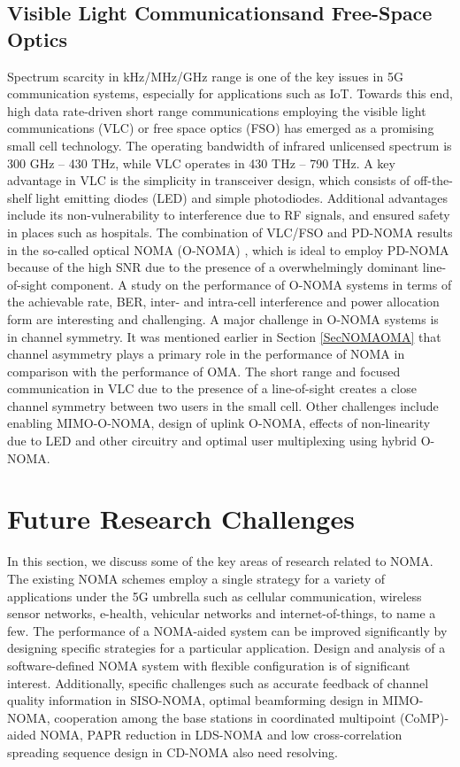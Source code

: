 \begin{multicols}{2}
\subsection{Visible Light Communications\hfill\break and Free-Space Optics}
Spectrum scarcity in kHz/MHz/GHz range is one of the key issues in 5G communication systems, especially for applications such as IoT. Towards this end, high data rate-driven short range communications employing the visible light communications (VLC) or free space optics (FSO) has emerged as a promising small cell technology. The operating bandwidth of infrared unlicensed spectrum is 300 GHz -- 430 THz, while VLC operates in 430 THz -- 790 THz. A key advantage in VLC is the simplicity in transceiver design, which consists of off-the-shelf light emitting diodes (LED) and simple photodiodes. Additional advantages include its non-vulnerability to interference due to RF signals, and ensured safety in places such as hospitals. The combination of VLC/FSO and PD-NOMA results in the so-called optical NOMA (O-NOMA) \cite{Marshoud_WC_2018}, which is ideal to employ PD-NOMA because of the high SNR due to the presence of a overwhelmingly dominant line-of-sight component. A study on the performance of O-NOMA systems in terms of the achievable rate, BER, inter- and intra-cell interference and power allocation form are interesting and challenging. A major challenge in O-NOMA systems is in channel symmetry. It was mentioned earlier in Section \ref{SecNOMAOMA} that channel asymmetry plays a primary role in the performance of NOMA in comparison with the performance of OMA. The short range and focused communication in VLC due to the presence of a line-of-sight creates a close channel symmetry between two users in the small cell. Other challenges include enabling MIMO-O-NOMA, design of uplink O-NOMA, effects of non-linearity due to LED and other circuitry and optimal user multiplexing using hybrid O-NOMA.

\section{Future Research Challenges}
In this section, we discuss some of the key areas of research related to NOMA. The existing NOMA schemes employ a single strategy for a variety of applications under the 5G umbrella such as cellular communication, wireless sensor networks, e-health, vehicular networks and internet-of-things, to name a few. The performance of a NOMA-aided system can be improved significantly by designing specific strategies for a particular application. Design and analysis of a software-defined NOMA system with flexible configuration is of significant interest. Additionally, specific challenges such as accurate feedback of channel quality information in SISO-NOMA, optimal beamforming design in MIMO-NOMA, cooperation among the base stations in coordinated multipoint (CoMP)-aided NOMA, PAPR reduction in LDS-NOMA and low cross-correlation spreading sequence design in CD-NOMA also need resolving.


\end{multicols}
